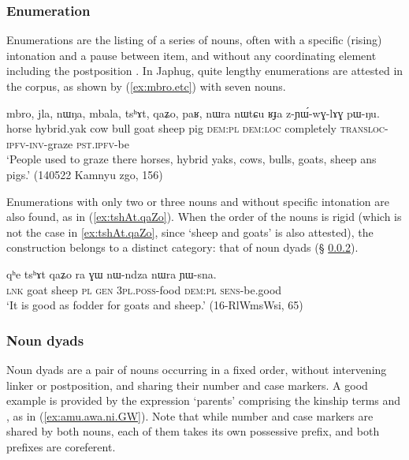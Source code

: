 \subsubsection{Enumeration} \label{sec:noun.enumeration}
Enumerations are the listing of a series of nouns, often with a specific (rising) intonation and a pause between item, and without any coordinating element including the postposition . In Japhug, quite lengthy enumerations are attested in the corpus, as shown by (\ref{ex:mbro.etc}) with seven nouns.

\begin{exe}
\ex \label{ex:mbro.etc}
 \gll mbro, jla, nɯŋa, mbala, tsʰɤt, qaʑo, paʁ, nɯra nɯtɕu ʁɟa z-ɲɯ́-wɣ-lɤɣ pɯ-ŋu. \\
 horse hybrid.yak cow bull goat sheep pig \textsc{dem}:\textsc{pl} \textsc{dem}:\textsc{loc} completely \textsc{transloc}-\textsc{ipfv}-\textsc{inv}-graze \textsc{pst}.\textsc{ipfv}-be \\
\glt `People used to graze there horses, hybrid yaks, cows, bulls, goats, sheep ans pigs.' (140522 Kamnyu zgo, 156)
\end{exe}

Enumerations with only two or three nouns and without specific intonation are also found, as in (\ref{ex:tshAt.qaZo}). When the order of the nouns is rigid (which is not the case in \ref{ex:tshAt.qaZo}, since  `sheep and goats' is also attested), the construction belongs to a distinct category: that of noun dyads (§ \ref{sec:dyads}).

\begin{exe}
\ex \label{ex:tshAt.qaZo}
 \gll  qʰe tsʰɤt qaʑo ra ɣɯ nɯ-ndza nɯra ɲɯ-sna.  \\
 \textsc{lnk} goat sheep \textsc{pl} \textsc{gen} \textsc{3pl}.\textsc{poss}-food \textsc{dem}:\textsc{pl} \textsc{sens}-be.good \\
\glt `It is good as fodder for goats and sheep.' (16-RlWmsWsi, 65)
\end{exe}

\subsubsection{Noun dyads} \label{sec:dyads}
Noun dyads are a pair of nouns occurring in a fixed order, without intervening linker or postposition, and sharing their number and case markers. A good example is provided by the expression `parents' comprising the kinship terms  and , as in (\ref{ex:amu.awa.ni.GW}). Note that while number and case markers are shared by both nouns, each of them takes its own possessive prefix, and both prefixes are coreferent. 

